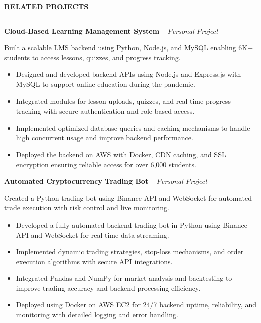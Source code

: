 \documentclass[10pt,letterpaper]{article}
\begin{document}
\vspace{6pt}

\textbf{RELATED PROJECTS}\\[-8pt]
\noindent\rule{\textwidth}{1pt}

\vspace{-2pt}

\textbf{Cloud-Based Learning Management System} -- \emph{Personal Project}

\vspace{-1pt}

Built a scalable LMS backend using Python, Node.js, and MySQL enabling 6K+ students to access lessons, quizzes, and progress tracking.
\vspace{-1pt}
\begin{itemize}
\item Designed and developed backend APIs using Node.js and Express.js with MySQL to support online education during the pandemic.
\item Integrated modules for lesson uploads, quizzes, and real-time progress tracking with secure authentication and role-based access.
\item Implemented optimized database queries and caching mechanisms to handle high concurrent usage and improve backend performance.
\item Deployed the backend on AWS with Docker, CDN caching, and SSL encryption ensuring reliable access for over 6,000 students.
\end{itemize}

\textbf{Automated Cryptocurrency Trading Bot} -- \emph{Personal Project}

\vspace{-1pt}

Created a Python trading bot using Binance API and WebSocket for automated trade execution with risk control and live monitoring.
\vspace{-1pt}
\begin{itemize}
\item Developed a fully automated backend trading bot in Python using Binance API and WebSocket for real-time data streaming.
\item Implemented dynamic trading strategies, stop-loss mechanisms, and order execution algorithms with secure API integrations.
\item Integrated Pandas and NumPy for market analysis and backtesting to improve trading accuracy and backend processing efficiency.
\item Deployed using Docker on AWS EC2 for 24/7 backend uptime, reliability, and monitoring with detailed logging and error handling.
\end{itemize}
\end{document}
